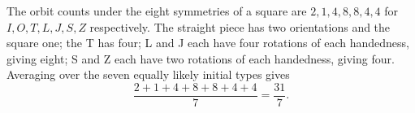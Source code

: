 The orbit counts under the eight symmetries of a square are $2,1,4,8,8,4,4$ for $I,O,T,L,J,S,Z$ respectively. The straight piece has two orientations and the square one; the T has four; L and J each have four rotations of each handedness, giving eight; S and Z each have two rotations of each handedness, giving four. Averaging over the seven equally likely initial types gives
\[\boxed{\dfrac{2+1+4+8+8+4+4}{7}=\dfrac{31}{7}}.\]
